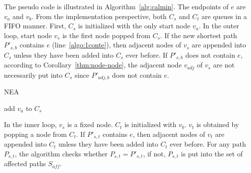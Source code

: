 The pseudo code is illustrated in Algorithm~\ref{alg:calmin}.
The endpoints of $e$ are $v_a$ and $v_b$.
From the implementation perspective, both $C_s$ and $C_t$ are queues in a FIFO manner.
First, $C_s$ is initialized with the only start node $v_a$.
In the outer loop, start node $v_s$ is the first node popped from $C_s$.
If the new shortest path $P'_{s,b}$ contains $e$ (line~\ref{algo:1conte}), then adjacent nodes of $v_s$ are appended into $C_s$ unless they have been added into $C_s$ ever before. If $P'_{s,b}$ does not contain $e$, according to Corollary~\ref{thm:node-node}, the adjacent node $v_{adj}$ of $v_s$ are not necessarily put into $C_s$ since $P'_{{adj},b}$ does not contain $e$.
\begin{algorithm}[htbp]
{\small
    \caption{NEA}
    \label{alg:calmin}

   add $v_a$ to $C_s$\;


}
\end{algorithm}

In the inner loop, $v_s$ is a fixed node.
$C_t$ is initialized with $v_b$.
$v_t$ is obtained by popping a node from $C_t$.
If $P'_{s,t}$ contains $e$, then adjacent nodes of $v_t$ are appended into $C_t$ unless they have been added into $C_t$ ever before.
For any path $P_{s,t}$, the algorithm checks whether $P_{s,t}=P'_{s,t}$, if not, $P_{s,t}$ is put into the set of affected paths $S_\textit{aff}$.


